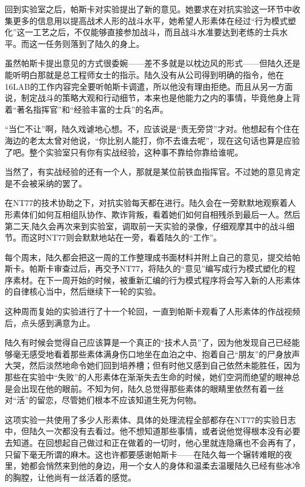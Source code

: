 回到实验室之后，帕斯卡对实验提出了新的意见。她要求在对抗实验这一环节中收集更多的信息用以提高战术人形的战斗水平，她希望人形素体在经过“行为模式塑化”这一工艺之后，不仅能够直接参加战斗，而且战斗水准要达到老练的士兵水平。而这一任务则落到了陆久的身上。

虽然帕斯卡提出意见的方式很委婉——差不多就是以枕边风的形式——但陆久还是能听明白那就是总工程师女士的指示。陆久没有从公司得到明确的指令，他在16LAB的工作内容完全要听帕斯卡调遣，所以他没有理由拒绝。而且从另一方面说，制定战斗的策略大观和行动细节，本来也是他能力之内的事情，毕竟他身上背着“著名指挥官”和“经验丰富的士兵”的名声。

“当仁不让”啊，陆久戏谑地心想。不，应该说是“责无旁贷”才对。他想起有个住在海边的老太太曾对他说，“你比别人能打，你不去谁去呢”，现在这句话也算是应验了吧。整个实验室只有你有实战经验，这种事不靠给你靠给谁呢。

当然了，有实战经验的还有一个人，那就是某位前铁血指挥官。不过她的意见肯定是不会被采纳的罢了。

在NT77的技术协助之下，对抗实验每天都在进行。陆久会在一旁默默地观察着人形素体们如何互相组队协作、欺诈背叛，看着她们如何自相残杀到最后一人。然后第二天,陆久会再次来到实验室，调取前一天实验的录像，仔细观摩其中的战斗细节。而这时NT77则会默默地站在一旁，看着陆久的“工作”。

每个周末，陆久都会把这一周的工作整理成书面材料并附上自己的意见，提交给帕斯卡。帕斯卡审查过后，再交予NT77，将陆久的“意见”编写成行为模式塑化的程序素材。在下一周开始的时候，被重新汇编的行为模式程序将会写入新的人形素体的自律核心当中，然后继续下一轮的实验。

这种周而复始的实验进行了十一个轮回，一直到帕斯卡观看了人形素体的作战视频后，点头感到满意为止。

陆久有时候会觉得自己应该算是一个真正的“技术人员”了，因为他发现自己已经能够毫无感受地看着那些素体满身伤口地坐在血泊之中、抱着自己“朋友”的尸身放声大哭，然后淡然地命令她们回到培养槽；但有时他又感到自己依然未能胜任，因为那些在实验中“失败”的人形素体在渐渐失去生命的时候，她们空洞而绝望的眼神总是会出现在他的眼前。不知为何，陆久总觉得那些素体的眼睛里依然有着一丝对“活”的留恋，尽管她们根本不应该知道生死为何物。

这项实验一共使用了多少人形素体、具体的处理流程全部都存在NT77的实验日志中，但陆久一次都没有去看过。他不想知道那些事情，或者说他觉得根本没有必要去知道。在回想起自己做过和正在做着的一切时，他心里就连隐痛也不会再有了，只留下毫无所谓的麻木。这也许都要感谢帕斯卡——在陆久每一个辗转难眠的夜里，她都会悄然来到他的身边，用一个女人的身体和温柔去温暖陆久已经有些冰冷的胸膛，让他尚有一丝活着的感觉。

